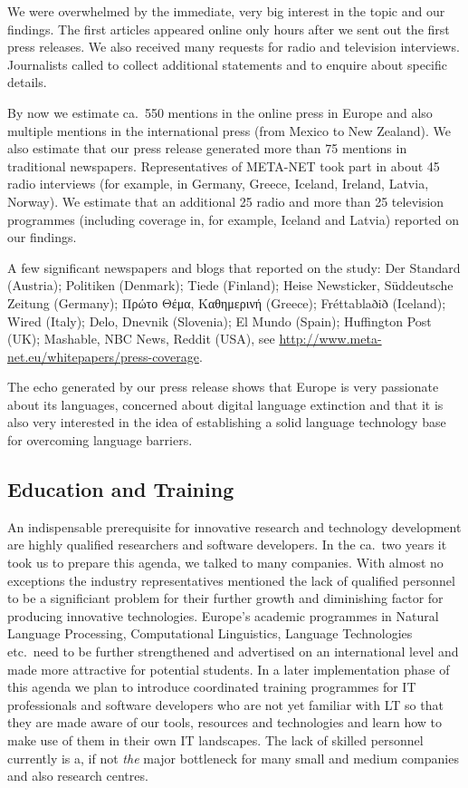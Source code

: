 \documentclass[10pt, plain]{../../metanetpaper}
\begin{document}
\begin{multicols}{2}
We were overwhelmed by the immediate, very big interest in the topic and our findings. The first articles appeared online only hours after we sent out the first press releases. We also received many requests for radio and television interviews. Journalists called to collect additional statements and to enquire about specific details. 

By now we estimate ca.~550 mentions in the online press in Europe and also multiple mentions in the international press (from Mexico to New Zealand). We also estimate that our press release generated more than 75 mentions in traditional newspapers. Representatives of META-NET took part in about 45 radio interviews (for example, in Germany, Greece, Iceland, Ireland, Latvia, Norway). We estimate that an additional 25 radio and more than 25 television programmes (including coverage in, for example, Iceland and Latvia) reported on our findings. 

A few significant newspapers and blogs that reported on the study: Der Standard (Austria); Politiken (Denmark); Tiede (Finland); Heise Newsticker, Süddeutsche Zeitung (Germany); Πρώτο Θέμα, Καθημερινή (Greece); Fréttablaðið (Iceland); Wired (Italy); Delo, Dnevnik (Slovenia); El Mundo (Spain); Huffington Post (UK); Mashable, NBC News, Reddit (USA), see \url{http://www.meta-net.eu/whitepapers/press-coverage}. 

The echo generated by our press release shows that Europe is very passionate about its languages, concerned about digital language extinction and that it is also very interested in the idea of establishing a solid language technology base for overcoming language barriers. 

\subsection{Education and Training}
\label{sec:improved-edu-and-training}

An indispensable prerequisite for innovative research and technology development are highly qualified researchers and software developers. In the ca.~two years it took us to prepare this agenda, we talked to many companies. With almost no exceptions the industry representatives mentioned the lack of qualified personnel to be a significiant problem for their further growth and diminishing factor for producing innovative technologies. Europe's academic programmes in Natural Language Processing, Computational Linguistics, Language Technologies etc.~need to be further strengthened and advertised on an international level and made more attractive for potential students. In a later implementation phase of this agenda we plan to introduce coordinated training programmes for IT professionals and software developers who are not yet familiar with LT so that they are made aware of our tools, resources and technologies and learn how to make use of them in their own IT landscapes. The lack of skilled personnel currently is a, if not \emph{the} major bottleneck for many small and medium companies and also research centres.


\end{multicols}
\end{document}
